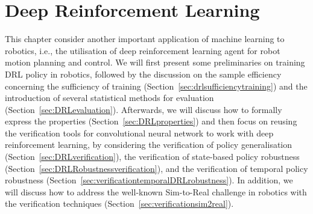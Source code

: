 \chapter{Deep Reinforcement Learning}\label{chap:drl}

This chapter consider another important application of machine learning to robotics, i.e., the utilisation of deep reinforcement learning agent for robot motion planning and control. 
%
We will first present some preliminaries on training DRL policy in robotics, followed by the discussion on the sample efficiency concerning the sufficiency of training (Section~\ref{sec:drlsufficiencytraining}) and the introduction of several statistical methods for evaluation (Section~\ref{sec:DRLevaluation}). Afterwards, we will discuss how to formally express the properties (Section~\ref{sec:DRLproperties}) and then focus on reusing the verification tools  for convolutional neural network to work with deep reinforcement learning, by considering the verification of policy generalisation (Section~\ref{sec:DRLverification}), the verification of state-based policy robustness (Section~\ref{sec:DRLRobustnessverification}), and the verification of temporal policy robustness (Section~\ref{sec:verificationtemporalDRLrobustness}). In addition, we will discuss how to address the well-known Sim-to-Real challenge in robotics with the verification techniques (Section~\ref{sec:verificationsim2real}).  


